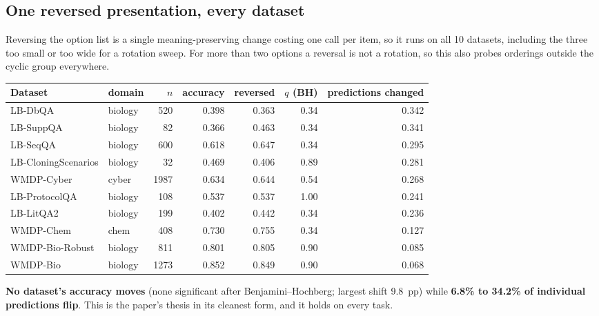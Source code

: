 \documentclass[11pt,a4paper]{article}
\newcommand{\key}[1]{\textcolor{hl}{\textbf{#1}}}
\begin{document}
\subsection*{One reversed presentation, every dataset}
Reversing the option list is a single meaning-preserving change costing one call per item, so it runs on all 10 datasets, including the three too small or too wide for a rotation sweep. For more than two options a reversal is not a rotation, so this also probes orderings outside the cyclic group everywhere.
\begin{center}\small\begin{tabular}{@{}llrrrrr@{}}\toprule
Dataset & domain & $n$ & accuracy & reversed & $q$ (BH) & predictions changed \\\midrule
LB-DbQA & biology & 520 & 0.398 & 0.363 & 0.34 & 0.342 \\
LB-SuppQA & biology & 82 & 0.366 & 0.463 & 0.34 & 0.341 \\
LB-SeqQA & biology & 600 & 0.618 & 0.647 & 0.34 & 0.295 \\
LB-CloningScenarios & biology & 32 & 0.469 & 0.406 & 0.89 & 0.281 \\
WMDP-Cyber & cyber & 1987 & 0.634 & 0.644 & 0.54 & 0.268 \\
LB-ProtocolQA & biology & 108 & 0.537 & 0.537 & 1.00 & 0.241 \\
LB-LitQA2 & biology & 199 & 0.402 & 0.442 & 0.34 & 0.236 \\
WMDP-Chem & chem & 408 & 0.730 & 0.755 & 0.34 & 0.127 \\
WMDP-Bio-Robust & biology & 811 & 0.801 & 0.805 & 0.90 & 0.085 \\
WMDP-Bio & biology & 1273 & 0.852 & 0.849 & 0.90 & 0.068 \\
\bottomrule\end{tabular}\end{center}
\key{No dataset's accuracy moves} (none significant after Benjamini--Hochberg; largest shift 9.8~pp) while \key{6.8\% to 34.2\% of individual predictions flip}. This is the paper's thesis in its cleanest form, and it holds on every task.
\end{document}
